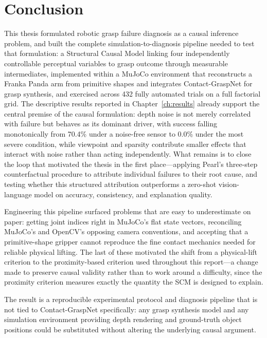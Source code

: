 \documentclass[11pt,a4paper]{report}
\begin{document}
\chapter{Conclusion}
\label{ch:conclusion}

This thesis formulated robotic grasp failure diagnosis as a causal inference problem, and built the complete simulation-to-diagnosis pipeline needed to test that formulation: a Structural Causal Model linking four independently controllable perceptual variables to grasp outcome through measurable intermediates, implemented within a MuJoCo environment that reconstructs a Franka Panda arm from primitive shapes and integrates Contact-GraspNet for grasp synthesis, and exercised across 432 fully automated trials on a full factorial grid. The descriptive results reported in Chapter~\ref{ch:results} already support the central premise of the causal formulation: depth noise is not merely correlated with failure but behaves as its dominant driver, with success falling monotonically from 70.4\% under a noise-free sensor to 0.0\% under the most severe condition, while viewpoint and sparsity contribute smaller effects that interact with noise rather than acting independently. What remains is to close the loop that motivated the thesis in the first place---applying Pearl's three-step counterfactual procedure to attribute individual failures to their root cause, and testing whether this structured attribution outperforms a zero-shot vision-language model on accuracy, consistency, and explanation quality.

Engineering this pipeline surfaced problems that are easy to underestimate on paper: getting joint indices right in MuJoCo's flat state vectors, reconciling MuJoCo's and OpenCV's opposing camera conventions, and accepting that a primitive-shape gripper cannot reproduce the fine contact mechanics needed for reliable physical lifting. The last of these motivated the shift from a physical-lift criterion to the proximity-based criterion used throughout this report---a change made to preserve causal validity rather than to work around a difficulty, since the proximity criterion measures exactly the quantity the SCM is designed to explain.

The result is a reproducible experimental protocol and diagnosis pipeline that is not tied to Contact-GraspNet specifically: any grasp synthesis model and any simulation environment providing depth rendering and ground-truth object positions could be substituted without altering the underlying causal argument.
\end{document}
